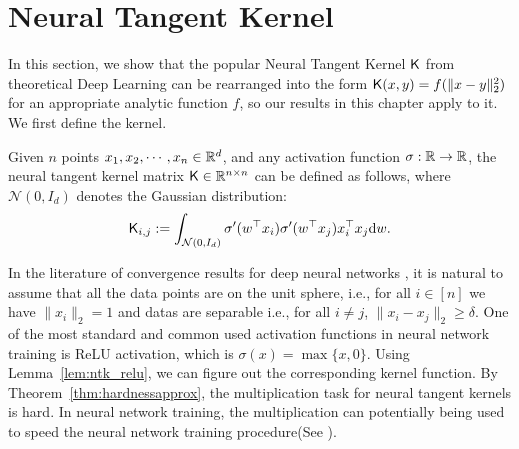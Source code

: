 
\section{Neural Tangent Kernel} \label{sec:ntk}

In this section, we show that the popular Neural Tangent Kernel $\mathsf{K}$
from theoretical Deep Learning can be rearranged into the form $\mathsf{K}(x,y)
  = f(\|x-y\|_2^2)$ for an appropriate analytic function $f$, so our
  results in this chapter apply to it.
We first define the kernel. 
\begin{definition}\label{def:neural_tangent_kernel}
Given $n$ points $x_1, x_2, \cdots, x_n \in {\mathbb R}^d$, and any activation function $\sigma : {\mathbb R} \rightarrow {\mathbb R}$, the neural tangent kernel matrix $\mathsf{K} \in {\mathbb R}^{n \times n}$ can be defined as follows, where $\mathcal{N}(0,I_d)$ denotes the Gaussian distribution:
\begin{align*}
\mathsf{K}_{i,j}:= \int_{\mathcal{N}(0,I_d)} \sigma'(w^\top x_i)\sigma'(w^\top x_j) x_i^\top x_j \mathrm{d} w .
\end{align*}
\end{definition}

In the literature of convergence results for deep neural networks \cite{ll18,dzps19,als18,als19,sy19,bpsw20,lsswy20}, it is natural to assume that all the data points are on the unit sphere, i.e., for all $i \in [n]$ we have $\| x_i \|_2 = 1$ and datas are separable i.e., for all $i\neq j$, $\| x_i - x_j \|_2 \geq \delta$. One of the most standard and common used activation functions in neural network training is ReLU activation, which is $\sigma(x) = \max\{x,0\}$. Using Lemma~\ref{lem:ntk_relu}, we can figure out the corresponding kernel function. By Theorem~\ref{thm:hardnessapprox}, the multiplication task for neural tangent kernels is hard. In neural network training, the multiplication can potentially being used to speed the neural network training procedure(See \cite{sy19}).





